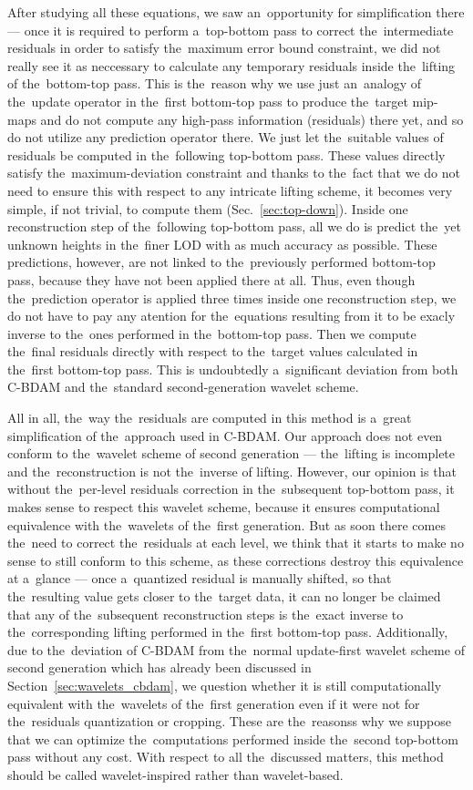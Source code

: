 After studying all these equations, we saw an~opportunity for simplification there --- once it is required to perform a~top-bottom pass to correct the~intermediate residuals in order to satisfy the~maximum error bound constraint, we did not really see it as neccessary to calculate any temporary residuals inside the~lifting of the~bottom-top pass. This is the~reason why we use just an~analogy of the~update operator in the~first bottom-top pass to produce the~target mip-maps and do not compute any high-pass information (residuals) there yet, and so do not utilize any prediction operator there. We just let the~suitable values of residuals be computed in the~following top-bottom pass. These values directly satisfy the~maximum-deviation constraint and thanks to the~fact that we do not need to ensure this with respect to any intricate lifting scheme, it becomes very simple, if not trivial, to compute them (Sec.~\ref{sec:top-down}). Inside one reconstruction step of the~following top-bottom pass, all we do is predict the~yet unknown heights in the~finer LOD with as much accuracy as possible. These predictions, however, are not linked to the~previously performed bottom-top pass, because they have not been applied there at all. Thus, even though the~prediction operator is applied three times inside one reconstruction step, we do not have to pay any atention for the~equations resulting from it to be exacly inverse to the~ones performed in the~bottom-top pass. Then we compute the~final residuals directly with respect to the~target values calculated in the~first bottom-top pass. This is undoubtedly a~significant deviation from both C-BDAM and the~standard second-generation wavelet scheme. 

All in all, the~way the~residuals are computed in this method is a~great simplification of the~approach used in C-BDAM. Our approach does not even conform to the~wavelet scheme of second generation --- the~lifting is incomplete and the~reconstruction is not the~inverse of lifting. However, our opinion is that without the~per-level residuals correction in the~subsequent top-bottom pass, it makes sense to respect this wavelet scheme, because it ensures computational equivalence with the~wavelets of the~first generation. But as soon there comes the~need to correct the~residuals at each level, we think that it starts to make no sense to still conform to this scheme, as these corrections destroy this equivalence at a~glance --- once a~quantized residual is manually shifted, so that the~resulting value gets closer to the~target data, it can no longer be claimed that any of the~subsequent reconstruction steps is the~exact inverse to the~corresponding lifting performed in the~first bottom-top pass. Additionally, due to the~deviation of C-BDAM from the~normal update-first wavelet scheme of second generation which has already been discussed in Section~\ref{sec:wavelets_cbdam}, we question whether it is still computationally equivalent with the~wavelets of the~first generation even if it were not for the~residuals quantization or cropping. These are the~reasonss why we suppose that we can optimize the~computations performed inside the~second top-bottom pass without any cost. With respect to all the~discussed matters, this method should be called wavelet-inspired rather than wavelet-based.